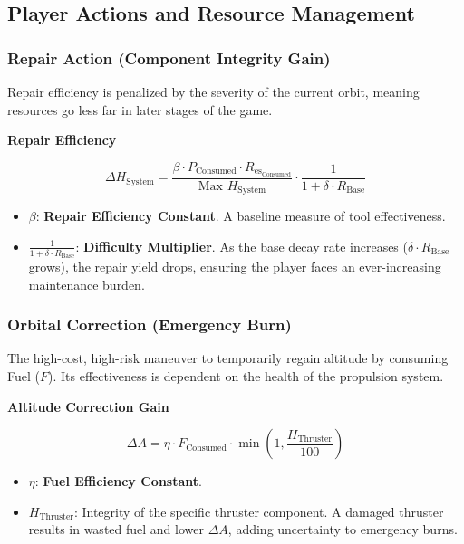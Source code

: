 \documentclass{article}
\newenvironment{mathbox}[1][\unskip]{
    \begin{tcolorbox}
    \textbf{#1}
}{
    \end{tcolorbox}
}
\begin{document}
\vspace{1em}
\subsection{Player Actions and Resource Management}\hspace{0.5em}

\subsubsection{Repair Action (Component Integrity Gain)}
Repair efficiency is penalized by the severity of the current orbit, meaning resources go less far in later stages of the game.

\begin{mathbox}[\color{DeepVoid}Repair Efficiency]
$$
\Delta H_{\text{System}} = \frac{\beta \cdot P_{\text{Consumed}} \cdot R_{\text{es}_{\text{Consumed}}}}{\text{Max } H_{\text{System}}} \cdot \frac{1}{1 + \delta \cdot R_{\text{Base}}}
$$
\end{mathbox}

\begin{itemize}
    \item $\beta$: \textbf{Repair Efficiency Constant}. A baseline measure of tool effectiveness.
    \item $\frac{1}{1 + \delta \cdot R_{\text{Base}}}$: \textbf{Difficulty Multiplier}. As the base decay rate increases ($\delta \cdot R_{\text{Base}}$ grows), the repair yield drops, ensuring the player faces an ever-increasing maintenance burden.
\end{itemize}

\subsubsection{Orbital Correction (Emergency Burn)}
The high-cost, high-risk maneuver to temporarily regain altitude by consuming Fuel ($F$). Its effectiveness is dependent on the health of the propulsion system.

\begin{mathbox}[\color{DeepVoid}Altitude Correction Gain]
$$
\Delta A = \eta \cdot F_{\text{Consumed}} \cdot \min\left(1, \frac{H_{\text{Thruster}}}{100}\right)
$$
\end{mathbox}

\begin{itemize}
    \item $\eta$: \textbf{Fuel Efficiency Constant}.
    \item $H_{\text{Thruster}}$: Integrity of the specific thruster component. A damaged thruster results in wasted fuel and lower $\Delta A$, adding uncertainty to emergency burns.
\end{itemize}
\end{document}
